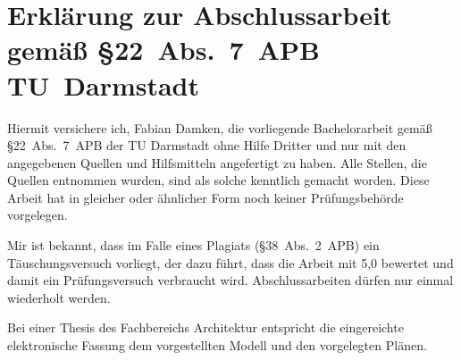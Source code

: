 

\section*{Erklärung zur Abschlussarbeit gemäß \S{}22~Abs.~7~APB TU~Darmstadt}
	Hiermit versichere ich, Fabian Damken, die vorliegende Bachelorarbeit gemäß \S{}22~Abs.~7~APB der TU Darmstadt ohne Hilfe Dritter und nur mit den angegebenen Quellen und Hilfsmitteln angefertigt zu haben. Alle Stellen, die Quellen entnommen wurden, sind als solche kenntlich gemacht worden. Diese Arbeit hat in gleicher oder ähnlicher Form noch keiner Prüfungsbehörde vorgelegen.

	Mir ist bekannt, dass im Falle eines Plagiats (\S{}38~Abs.~2~APB) ein Täuschungsversuch vorliegt, der dazu führt, dass die Arbeit mit 5,0 bewertet und damit ein Prüfungsversuch verbraucht wird. Abschlussarbeiten dürfen nur einmal wiederholt werden.

	Bei einer Thesis des Fachbereichs Architektur entspricht die eingereichte elektronische Fassung dem vorgestellten Modell und den vorgelegten Plänen.

	\AffidavitSignature[Darmstadt]
